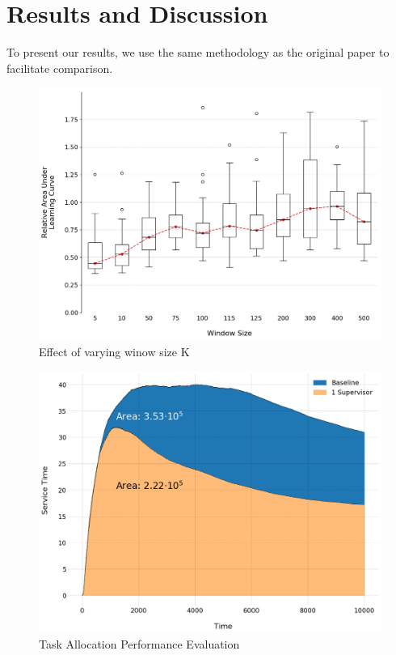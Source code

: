 \documentclass[letterpaper]{article}
\begin{document}
\section{Results and Discussion}
To present our results, we use the same methodology as the original paper to facilitate comparison.
\begin{figure}[ht]
 \begin{center}
  \includegraphics[width=\linewidth]{figures/figure4_extended}
  \caption{Effect of varying winow size K}
  \label{fig:windows}
 \end{center}
\end{figure}
\begin{figure}[ht]
 \begin{center}
  \includegraphics[width=\linewidth]{figures/figure5_light}
  \caption{Task Allocation Performance Evaluation}
  \label{fig:areas}
 \end{center}
\end{figure}
\end{document}

